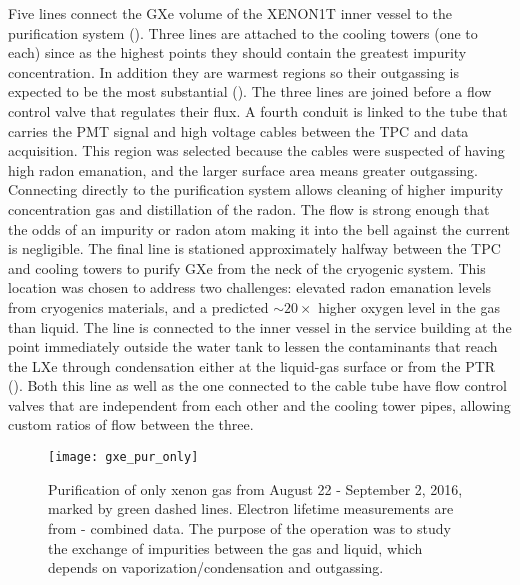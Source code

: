 Five lines connect the GXe volume of the XENON1T inner vessel to the purification system ().  Three lines are
attached to the cooling towers (one to each) since as the highest points they should contain the greatest impurity concentration.  In
addition they are warmest regions so their outgassing is expected to be the most
substantial ().  The three lines are joined before a flow control valve
that regulates their flux.  A fourth conduit is linked to the tube that carries the PMT signal and high voltage cables between the TPC and
data acquisition.  This region was selected because the cables were suspected of having high radon emanation, and the larger surface area
means greater outgassing.  Connecting directly to the purification system allows cleaning of higher impurity concentration gas and
distillation of the radon.  The flow is strong enough that the odds of an impurity or radon atom making it into the bell against the
current is negligible.  The final line is stationed
approximately halfway between the TPC and cooling towers to purify GXe from the neck of the cryogenic system.  This location was
chosen to address two challenges: elevated radon emanation levels from cryogenics materials, and a predicted ${\sim}20\times$ higher
oxygen level in the gas than liquid.  The line is connected to the inner vessel in the service building at the point immediately outside
the water tank to lessen the contaminants that reach the LXe through condensation either at the liquid-gas surface or from the PTR
().  Both this line as well
as the one connected to the cable tube have flow control valves that are independent from each other and the cooling tower pipes, allowing
custom ratios of flow between the three.

\begin{figure}
\centering
\texttt{[image: gxe\_pur\_only]}
\caption[Purification of only xenon gas from August 22 - September 2, 2016, marked by green dashed lines.  The purpose of the operation was
to study the exchange of impurities between the gas and liquid.]{Purification of only xenon gas from August 22 - September 2, 2016, marked by
green dashed lines.  Electron lifetime measurements
are from - combined data.  The purpose of the operation was to study the exchange of impurities between the
gas and liquid, which depends on vaporization/condensation and outgassing.}
\label{fig:electron_lifetime_model_gxe_xenon1t}
\end{figure}

